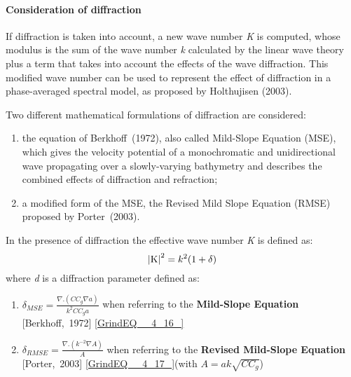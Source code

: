 \paragraph{ Consideration of diffraction}

 If diffraction is taken into account, a new wave number \textit{K} is computed, whose modulus is the sum of the wave number \textit{k} calculated by the linear wave theory plus a term that takes into account the effects of the wave diffraction. This modified wave number can be used to represent the effect of diffraction in a phase-averaged spectral model, as proposed by Holthujisen (2003).

 Two different mathematical formulations of diffraction are considered:

\begin{enumerate}
\item  the equation of Berkhoff~(1972), also called Mild-Slope Equation (MSE), which gives the velocity potential of a monochromatic and unidirectional wave propagating over a slowly-varying bathymetry and describes the combined effects of diffraction and refraction;

\item  a modified form of the MSE, the Revised Mild Slope Equation (RMSE) proposed by Porter~(2003).
\end{enumerate}

 In the presence of diffraction the effective wave number \textit{K} is defined as:
\begin{equation} \label{GrindEQ__4_15_}
\left|{\rm K} \right|^{2} =k^{2} (1+\delta )
\end{equation}
where \textit{d} is a diffraction parameter defined as:

\begin{enumerate}
\item  $\delta _{MSE} =\frac{\nabla .\left(CC_{g} \nabla a\right)}{k^{2} CC_{g} a} $ when referring to the \textbf{Mild-Slope Equation} [Berkhoff,~1972]           \eqref{GrindEQ__4_16_}

\item  $\delta _{RMSE} =\frac{\nabla .\left(k^{-2} \nabla A\right)}{A} $ when referring to the \textbf{Revised Mild-Slope Equation} [Porter,~2003]          \eqref{GrindEQ__4_17_}(with $A=ak\sqrt{CC_{g} } $)
\end{enumerate}

